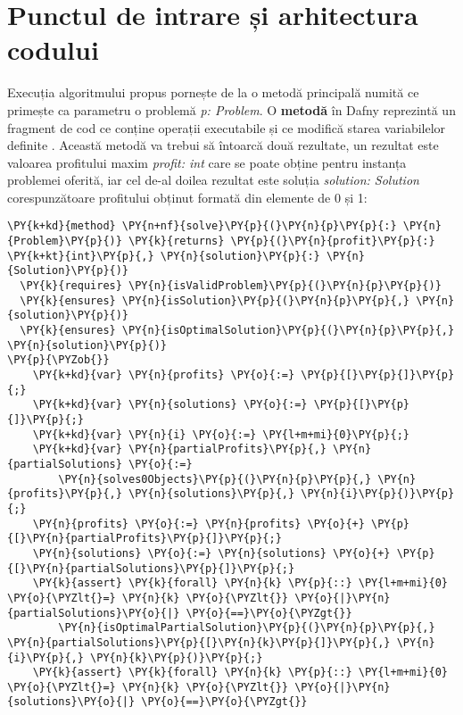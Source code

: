 \chapter{Punctul de intrare și arhitectura codului}
\begin{sloppypar}

Execuția algoritmului propus pornește de la o metodă principală numită  ce primește ca parametru o problemă \textit{p: Problem}. O \textbf{metodă} în Dafny reprezintă un fragment de cod ce conține operații executabile și ce modifică starea variabilelor definite \cite{DBLP:series/natosec/KoenigL12}. Această metodă va trebui să întoarcă două rezultate, un rezultat este valoarea profitului maxim \textit{profit: int} care se poate obține pentru instanța problemei oferită, iar cel de-al doilea rezultat este soluția \textit{solution: Solution} corespunzătoare profitului obținut formată din elemente de 0 și 1:
\begin{Verbatim}[commandchars=\\\{\}]
\PY{k+kd}{method} \PY{n+nf}{solve}\PY{p}{(}\PY{n}{p}\PY{p}{:} \PY{n}{Problem}\PY{p}{)} \PY{k}{returns} \PY{p}{(}\PY{n}{profit}\PY{p}{:} \PY{k+kt}{int}\PY{p}{,} \PY{n}{solution}\PY{p}{:} \PY{n}{Solution}\PY{p}{)}
  \PY{k}{requires} \PY{n}{isValidProblem}\PY{p}{(}\PY{n}{p}\PY{p}{)}
  \PY{k}{ensures} \PY{n}{isSolution}\PY{p}{(}\PY{n}{p}\PY{p}{,} \PY{n}{solution}\PY{p}{)}
  \PY{k}{ensures} \PY{n}{isOptimalSolution}\PY{p}{(}\PY{n}{p}\PY{p}{,} \PY{n}{solution}\PY{p}{)}
\PY{p}{\PYZob{}}
    \PY{k+kd}{var} \PY{n}{profits} \PY{o}{:=} \PY{p}{[}\PY{p}{]}\PY{p}{;} 
    \PY{k+kd}{var} \PY{n}{solutions} \PY{o}{:=} \PY{p}{[}\PY{p}{]}\PY{p}{;}
    \PY{k+kd}{var} \PY{n}{i} \PY{o}{:=} \PY{l+m+mi}{0}\PY{p}{;}
    \PY{k+kd}{var} \PY{n}{partialProfits}\PY{p}{,} \PY{n}{partialSolutions} \PY{o}{:=} 
        \PY{n}{solves0Objects}\PY{p}{(}\PY{n}{p}\PY{p}{,} \PY{n}{profits}\PY{p}{,} \PY{n}{solutions}\PY{p}{,} \PY{n}{i}\PY{p}{)}\PY{p}{;}
    \PY{n}{profits} \PY{o}{:=} \PY{n}{profits} \PY{o}{+} \PY{p}{[}\PY{n}{partialProfits}\PY{p}{]}\PY{p}{;}
    \PY{n}{solutions} \PY{o}{:=} \PY{n}{solutions} \PY{o}{+} \PY{p}{[}\PY{n}{partialSolutions}\PY{p}{]}\PY{p}{;}
    \PY{k}{assert} \PY{k}{forall} \PY{n}{k} \PY{p}{::} \PY{l+m+mi}{0} \PY{o}{\PYZlt{}=} \PY{n}{k} \PY{o}{\PYZlt{}} \PY{o}{|}\PY{n}{partialSolutions}\PY{o}{|} \PY{o}{==}\PY{o}{\PYZgt{}} 
        \PY{n}{isOptimalPartialSolution}\PY{p}{(}\PY{n}{p}\PY{p}{,} \PY{n}{partialSolutions}\PY{p}{[}\PY{n}{k}\PY{p}{]}\PY{p}{,} \PY{n}{i}\PY{p}{,} \PY{n}{k}\PY{p}{)}\PY{p}{;}
    \PY{k}{assert} \PY{k}{forall} \PY{n}{k} \PY{p}{::} \PY{l+m+mi}{0} \PY{o}{\PYZlt{}=} \PY{n}{k} \PY{o}{\PYZlt{}} \PY{o}{|}\PY{n}{solutions}\PY{o}{|} \PY{o}{==}\PY{o}{\PYZgt{}} 

\end{Verbatim}
\end{sloppypar}
